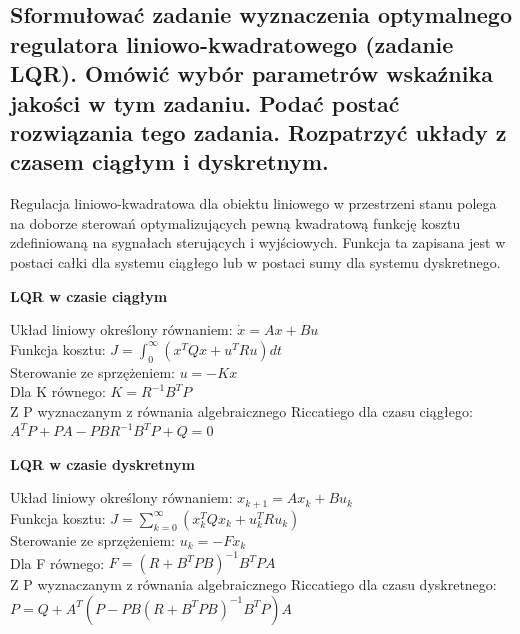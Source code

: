 \subsection{Sformułować zadanie wyznaczenia optymalnego regulatora liniowo-kwadratowego (zadanie LQR). Omówić wybór parametrów wskaźnika jakości w tym zadaniu. Podać postać rozwiązania tego zadania. Rozpatrzyć układy z czasem ciągłym i dyskretnym.}
Regulacja liniowo-kwadratowa dla obiektu liniowego w przestrzeni stanu polega na doborze sterowań optymalizujących pewną kwadratową funkcję kosztu zdefiniowaną na sygnałach sterujących i wyjściowych. Funkcja ta zapisana jest w postaci całki dla systemu ciągłego lub w postaci sumy dla systemu dyskretnego.

\textbf{LQR w czasie ciągłym}

Układ liniowy określony równaniem: $\dot{x}=Ax+Bu$\\
Funkcja kosztu: $J=\int_0^\infty \left( x^TQx + u^TRu \right)dt$\\
Sterowanie ze sprzężeniem: $u=-Kx$\\
Dla K równego: $K=R^{-1}B^TP$\\
Z P wyznaczanym z równania algebraicznego Riccatiego dla czasu ciągłego:\\
$A^TP+PA-PBR^{-1}B^TP+Q=0$


\textbf{LQR w czasie dyskretnym}

Układ liniowy określony równaniem: $x_{k+1}=Ax_k+Bu_k$\\
Funkcja kosztu: $J=\sum_{k=0}^\infty \left( x_k^TQx_k + u_k^TRu_k \right)$\\
Sterowanie ze sprzężeniem: $u_k=-Fx_k$\\
Dla F równego: $F=\left(R+B^TPB\right)^{-1}B^TPA$\\
Z P wyznaczanym z równania algebraicznego Riccatiego dla czasu dyskretnego:\\
$P=Q+A^T\left(P-PB\left(R+B^TPB\right)^{-1}B^TP\right)A$


